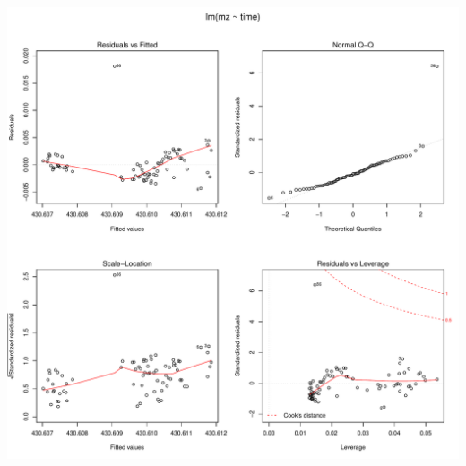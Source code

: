 \documentclass[]{article}
\begin{document}
\includegraphics{Supplementary_document_files/figure-latex/fit.lin.430-1.pdf}
\end{document}
